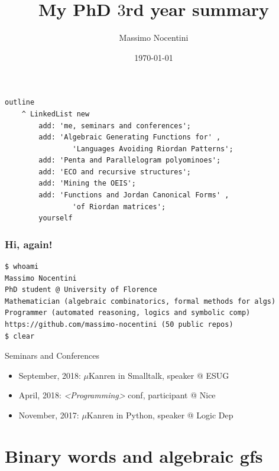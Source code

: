 \documentclass[9pt]{beamer}
\title{My PhD $3$rd year summary}
\author{Massimo Nocentini}
\institute{University of Florence, Italy}
\date{\today}
\begin{document}
\frame{\titlepage}


\begin{frame}[fragile]
\frametitle{}
\begin{verbatim}
outline
    ^ LinkedList new
        add: 'me, seminars and conferences';
        add: 'Algebraic Generating Functions for' ,
                'Languages Avoiding Riordan Patterns';
        add: 'Penta and Parallelogram polyominoes';
        add: 'ECO and recursive structures';
        add: 'Mining the OEIS';
        add: 'Functions and Jordan Canonical Forms' ,
                'of Riordan matrices';
        yourself
\end{verbatim}
\end{frame}


\begin{frame}[fragile]
\frametitle{Hi, again!}
\begin{Verbatim}
$ whoami
Massimo Nocentini
PhD student @ University of Florence
Mathematician (algebraic combinatorics, formal methods for algs)
Programmer (automated reasoning, logics and symbolic comp)
https://github.com/massimo-nocentini (50 public repos)
$ clear
\end{Verbatim}

\begin{block}{Seminars and Conferences}
\begin{itemize}
\item September, 2018: $\mu$Kanren in Smalltalk, speaker @ ESUG
\item April, 2018: \textit{<Programming>} conf, participant @ Nice
\item November, 2017: $\mu$Kanren in Python, speaker @ Logic Dep
\end{itemize}
\end{block}

\end{frame}

\section{Binary words and algebraic gfs}
\end{document}
